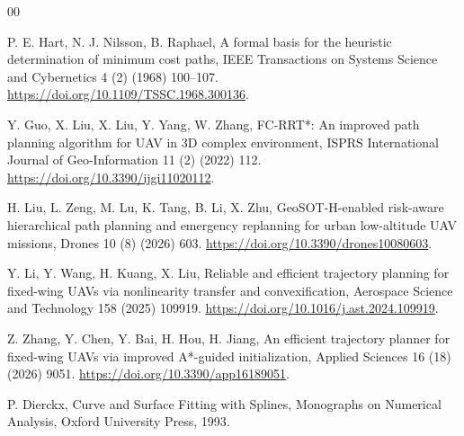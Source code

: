 \documentclass[preprint,12pt]{elsarticle}
\begin{document}
\begin{thebibliography}{00}

P. E. Hart, N. J. Nilsson, B. Raphael,
A formal basis for the heuristic determination of minimum cost paths,
IEEE Transactions on Systems Science and Cybernetics 4 (2) (1968) 100--107.
\url{https://doi.org/10.1109/TSSC.1968.300136}.

Y. Guo, X. Liu, X. Liu, Y. Yang, W. Zhang,
FC-RRT*: An improved path planning algorithm for UAV in 3D complex environment,
ISPRS International Journal of Geo-Information 11 (2) (2022) 112.
\url{https://doi.org/10.3390/ijgi11020112}.

H. Liu, L. Zeng, M. Lu, K. Tang, B. Li, X. Zhu,
GeoSOT-H-enabled risk-aware hierarchical path planning and emergency
replanning for urban low-altitude UAV missions,
Drones 10 (8) (2026) 603.
\url{https://doi.org/10.3390/drones10080603}.

Y. Li, Y. Wang, H. Kuang, X. Liu,
Reliable and efficient trajectory planning for fixed-wing UAVs via
nonlinearity transfer and convexification,
Aerospace Science and Technology 158 (2025) 109919.
\url{https://doi.org/10.1016/j.ast.2024.109919}.

Z. Zhang, Y. Chen, Y. Bai, H. Hou, H. Jiang,
An efficient trajectory planner for fixed-wing UAVs via improved
A*-guided initialization,
Applied Sciences 16 (18) (2026) 9051.
\url{https://doi.org/10.3390/app16189051}.

P. Dierckx, Curve and Surface Fitting with Splines,
Monographs on Numerical Analysis, Oxford University Press, 1993.

\end{thebibliography}
\end{document}
